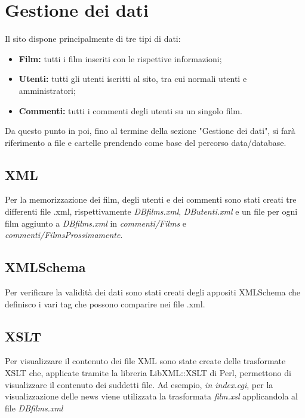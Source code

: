 \documentclass[../Relazione.tex]{subfiles}
\begin{document}
\section{Gestione dei dati}

Il sito dispone principalmente di tre tipi di dati:
\begin{itemize}
\item \textbf{Film:} tutti i film inseriti con le rispettive informazioni;
\item \textbf{Utenti:} tutti gli utenti iscritti al sito, tra cui normali utenti e amministratori;
\item \textbf{Commenti:} tutti i commenti degli utenti su un singolo film.
\end{itemize}

Da questo punto in poi, fino al termine della sezione "Gestione dei dati", si farà riferimento a file e cartelle prendendo come base del percorso data/database.

\subsection{XML}

Per la memorizzazione dei film, degli utenti e dei commenti sono stati creati tre differenti file .xml, rispettivamente \textit{DBfilms.xml}, \textit{DButenti.xml} e un file per ogni film aggiunto a \textit{DBfilms.xml} in \textit{commenti/Films} e \textit{commenti/FilmsProssimamente}.

\subsection{XMLSchema}

Per verificare la validità dei dati sono stati creati degli appositi XMLSchema che definisco i vari tag che possono comparire nei file .xml. 

\subsection{XSLT}

Per visualizzare il contenuto dei file XML sono state create delle trasformate XSLT che, applicate tramite la libreria LibXML::XSLT di Perl, permettono di visualizzare il contenuto dei suddetti file. Ad esempio, \textit{in index.cgi}, per la visualizzazione delle news viene utilizzata la trasformata \textit{film.xsl} applicandola al file \textit{DBfilms.xml}
			
\end{document}
